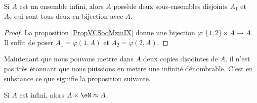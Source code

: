 \begin{corollary}       \label{CORooJCSIooOeOICJ}
	Si \( A\) est un ensemble infini, alors \( A\) possède deux sous-ensembles disjoints \( A_1\) et \( A_2\) qui sont tous deux en bijection avec \( A\).
\end{corollary}

\begin{proof}
	La proposition \ref{PropVCSooMzmIX} donne une bijection \( \varphi\colon \{ 1,2 \}\times A\to A\). Il suffit de poser \( A_1=\varphi(1,A)\) et \( A_2=\varphi(2,A)\).
\end{proof}

Maintenant que nous pouvons mettre dans \( A\) deux copies disjointes de \( A\), il n'est pas très étonnant que nous puissions en mettre une infinité dénombrable. C'est en substance ce que signifie la proposition suivante.
\begin{proposition} \label{PROPooFKBEooKXqujV}
	Si \( A\) est infini, alors \( A\times \eN\approx A\).
\end{proposition}

